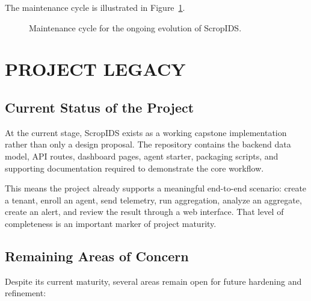 \documentclass[12pt,a4paper]{article}
\begin{document}
The maintenance cycle is illustrated in Figure~\ref{fig:maintenance-cycle}.

\begin{figure}[H]
\centering
{}
\caption{Maintenance cycle for the ongoing evolution of ScropIDS.}
\label{fig:maintenance-cycle}
\end{figure}

\clearpage
\section{PROJECT LEGACY}

\subsection{Current Status of the Project}
At the current stage, ScropIDS exists as a working capstone implementation rather than only a design proposal. The repository contains the backend data model, API routes, dashboard pages, agent starter, packaging scripts, and supporting documentation required to demonstrate the core workflow.

This means the project already supports a meaningful end-to-end scenario: create a tenant, enroll an agent, send telemetry, run aggregation, analyze an aggregate, create an alert, and review the result through a web interface. That level of completeness is an important marker of project maturity.

\subsection{Remaining Areas of Concern}
Despite its current maturity, several areas remain open for future hardening and refinement:
\end{document}
